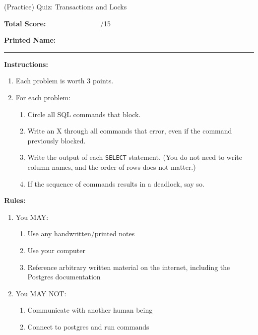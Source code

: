 \documentclass[10pt]{article}
\theoremstyle{definition}
\begin{document}
\begin{center}
{
\Large
    (Practice) Quiz: Transactions and Locks
}

    \vspace{0.1in}
\end{center}

\vspace{0.15in}
\noindent
\textbf{Total Score:} ~~~~~~~~~~~~~~~/15

\vspace{0.5in}
\noindent
\textbf{Printed Name:}

\noindent
\rule{\textwidth}{0.1pt}
\vspace{0.25in}

\noindent
\textbf{Instructions:}
\begin{enumerate}
    \item Each problem is worth 3 points.
    \item For each problem:
        \begin{enumerate}
        \item Circle all SQL commands that block.
        \item Write an X through all commands that error, even if the command previously blocked.
        \item Write the output of each \lstinline{SELECT} statement.
            (You do not need to write column names, and the order of rows does not matter.)
        \item If the sequence of commands results in a deadlock, say so.
        \end{enumerate}
\end{enumerate}

\vspace{0.2in}
\noindent
\textbf{Rules:}
\begin{enumerate}
    \item You MAY:
        \begin{enumerate}
            \item Use any handwritten/printed notes
            \item Use your computer
            \item Reference arbitrary written material on the internet, including the Postgres documentation
        \end{enumerate}
    \item You MAY NOT:
        \begin{enumerate}
            \item Communicate with another human being
            \item Connect to postgres and run commands
        \end{enumerate}
\end{enumerate}
\end{document}
